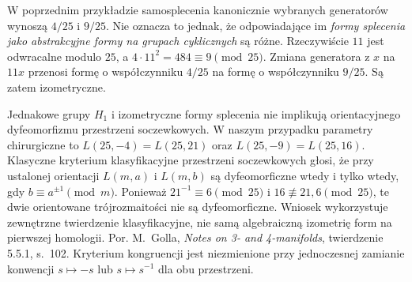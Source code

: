 \begin{uwaga}
\label{rem:tg-general-linking-iso}
W poprzednim przykładzie samosplecenia
kanonicznie wybranych generatorów
wynoszą $4/25$ i $9/25$.
Nie oznacza to jednak, że odpowiadające
im \emph{formy splecenia jako abstrakcyjne
formy na grupach cyklicznych} są różne.
Rzeczywiście $11$ jest odwracalne
modulo $25$, a
$4\cdot11^2=484\equiv9\pmod{25}$.
Zmiana generatora z $x$ na $11x$
przenosi formę o współczynniku
$4/25$ na formę o współczynniku
$9/25$. Są zatem izometryczne.

Jednakowe grupy $H_1$ i izometryczne
formy splecenia nie implikują
orientacyjnego dyfeomorfizmu
przestrzeni soczewkowych.
W naszym przypadku parametry
chirurgiczne to
$L(25,-4)=L(25,21)$ oraz
$L(25,-9)=L(25,16)$.
Klasyczne kryterium klasyfikacyjne
przestrzeni soczewkowych głosi,
że przy ustalonej orientacji
$L(m,a)$ i $L(m,b)$ są
dyfeomorficzne wtedy i tylko wtedy,
gdy $b\equiv a^{\pm1}\pmod m$.
Ponieważ $21^{-1}\equiv6\pmod{25}$
i $16\not\equiv21,6\pmod{25}$,
te dwie orientowane trójrozmaitości
nie są dyfeomorficzne.
Wniosek wykorzystuje zewnętrzne
twierdzenie klasyfikacyjne,
nie samą algebraiczną izometrię
form na pierwszej homologii.
Por. M.~Golla, \emph{Notes on 3- and 4-manifolds},
twierdzenie 5.5.1, s.~102. Kryterium
kongruencji jest niezmienione przy jednoczesnej
zamianie konwencji $s\mapsto-s$ lub $s\mapsto s^{-1}$
dla obu przestrzeni.
\end{uwaga}

\begin{center}
\end{center}

